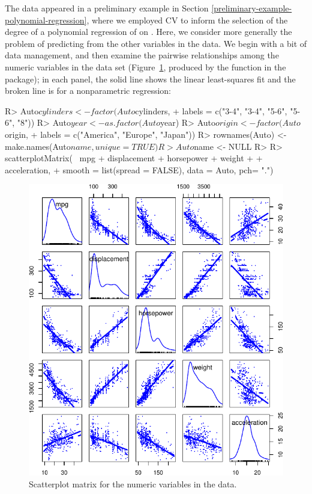 \documentclass[
]{jss}
\begin{document}
The  data appeared in a preliminary example in Section
\ref{preliminary-example-polynomial-regression}, where we employed CV to
inform the selection of the degree of a polynomial regression of
 on . Here, we consider more generally the
problem of predicting  from the other variables in the
 data. We begin with a bit of data management, and then
examine the pairwise relationships among the numeric variables in the
data set (Figure~\ref{fig:Auto-explore-scatterplot-matrix}, produced by
the  function in the  package); in
each panel, the solid line shows the linear least-squares fit and the
broken line is for a nonparametric regression:

\begin{CodeChunk}
\begin{CodeInput}
R> Auto$cylinders <- factor(Auto$cylinders,
+                          labels = c("3-4", "3-4", "5-6", "5-6", "8"))
R> Auto$year <- as.factor(Auto$year)
R> Auto$origin <- factor(Auto$origin,
+                       labels = c("America", "Europe", "Japan"))
R> rownames(Auto) <- make.names(Auto$name, unique = TRUE)
R> Auto$name <- NULL
R>
R> scatterplotMatrix(~ mpg + displacement + horsepower + weight
+                   + acceleration,
+                   smooth = list(spread = FALSE), data = Auto, pch= ".")
\end{CodeInput}
\begin{figure}

{\centering \includegraphics[width=0.95\linewidth]{Figures/Auto-explore-scatterplot-matrix-1}

}

\caption[Scatterplot matrix for the numeric variables in the  data]{Scatterplot matrix for the numeric variables in the  data.}\label{fig:Auto-explore-scatterplot-matrix}
\end{figure}
\end{CodeChunk}
\end{document}
